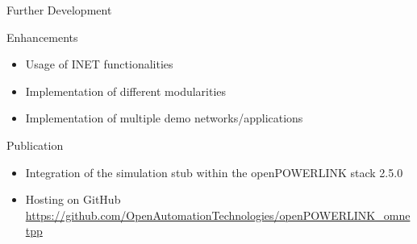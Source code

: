 \begin{frame}{Further Development}
    \begin{block}{Enhancements}
        \begin{itemize}
            \item Usage of INET functionalities
            \item Implementation of different modularities
            \item Implementation of multiple demo networks/applications
        \end{itemize}
    \end{block}
    \begin{block}{Publication}
        \begin{itemize}
            \item Integration of the simulation stub within the openPOWERLINK stack 2.5.0
            \item Hosting on GitHub\\
            \url{https://github.com/OpenAutomationTechnologies/openPOWERLINK\_omnetpp}
        \end{itemize}
    \end{block}
\end{frame}